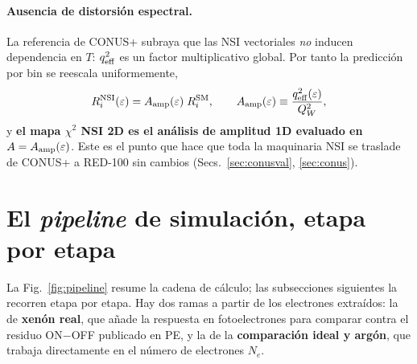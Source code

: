 \documentclass[11pt,a4paper]{article}
\newcommand{\eps}{\varepsilon}
\newcommand{\QW}{Q_{W}}
\newcommand{\Tnr}{T}
\newcommand{\Ne}{N_{e}}
\newcommand{\qeff}{q_{\rm eff}}
\newcommand{\Aamp}{A_{\rm amp}}
\begin{document}
\paragraph{Ausencia de distorsi\'on espectral.} La referencia de CONUS+ subraya
que las NSI vectoriales \emph{no} inducen dependencia en $\Tnr$: $\qeff^{2}$ es un
factor multiplicativo global. Por tanto la predicci\'on por bin se reescala
uniformemente,
\begin{equation}
  \label{eq:Aamp}
  R_{i}^{\rm NSI}(\eps) = \Aamp(\eps)\; R_{i}^{\rm SM},
  \qquad
  \Aamp(\eps) \equiv \frac{\qeff^{2}(\eps)}{\QW^{2}},
\end{equation}
y \textbf{el mapa $\chi^{2}$ NSI 2D es el an\'alisis de amplitud 1D evaluado en
$A = \Aamp(\eps)$}. Este es el punto que hace que toda la maquinaria NSI se
traslade de CONUS+ a RED-100 sin cambios (Secs.~\ref{sec:conusval},
\ref{sec:conus}).

\section{El \emph{pipeline} de simulaci\'on, etapa por etapa}
\label{sec:pipeline}

La Fig.~\ref{fig:pipeline} resume la cadena de c\'alculo; las subsecciones
siguientes la recorren etapa por etapa. Hay dos ramas a partir de los electrones
extra\'idos: la de \textbf{xen\'on real}, que a\~nade la respuesta en
fotoelectrones para comparar contra el residuo ON$-$OFF publicado en PE, y la de
la \textbf{comparaci\'on ideal y arg\'on}, que trabaja directamente en el n\'umero
de electrones $\Ne$.
\end{document}
